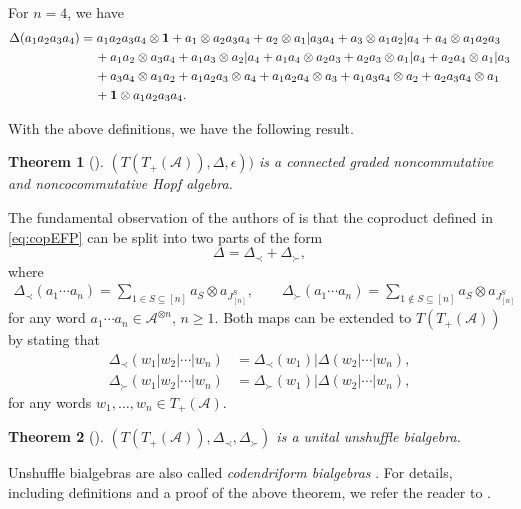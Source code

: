 \documentclass[pdftex]{sigma}%
\numberwithin{equation}{section}
\newtheorem{Theorem}{Theorem}[section]
\newcommand{\A}{\mathcal{A}}
\newcommand{\uno}{{\bf{1}}}
\begin{document}
\begin{Example}
For $n=4$, we have
\begin{align*}
	\Delta(a_1a_2a_3a_4)
={} & a_1a_2a_3a_4\otimes \uno + a_1 \otimes a_2a_3a_4 + a_2\otimes a_1| a_3a_4 + a_3 \otimes a_1a_2| a_4 + a_4\otimes a_1a_2a_3
	\\&\!{} + a_1a_2\otimes a_3a_4 + a_1a_3\otimes a_2|a_4 + a_1a_4\otimes a_2a_3 + a_2a_3\otimes a_1|a_4 + a_2a_4\otimes a_1|a_3
	\\&\!{} + a_3a_4\otimes a_1a_2 + a_1a_2a_3\otimes a_4 + a_1a_2a_4\otimes a_3 + a_1a_3a_4\otimes a_2 + a_2a_3a_4\otimes a_1
	\\&\!{} + \uno \otimes a_1a_2a_3a_4.
\end{align*}
\end{Example}
With the above definitions, we have the following result.

\begin{Theorem}[\cite{EFP1}]\label{thm:HopfAlg}
$(T(T_+(\A)),\Delta,\epsilon))$ is a connected graded noncommutative and noncocommutative Hopf algebra.
\end{Theorem}

The fundamental observation of the authors of \cite{EFP1} is that the coproduct defined in \eqref{eq:copEFP} can be split into two parts of the form
\[
	\Delta = \Delta_\prec + \Delta_\succ,
\]
where
\begin{gather*}
	\Delta_\prec (a_1\cdots a_n)
	= \sum_{1\in S\subseteq [n]} a_S \otimes a_{J_{[n]}^S},\qquad
 	\Delta_\succ (a_1\cdots a_n)
	= \sum_{1\not\in S\subseteq [n]} a_S \otimes a_{J_{[n]}^S}
\end{gather*}
for any word $a_1\cdots a_n\in \A^{\otimes n}$, $n\geq 1$. Both maps can be extended to $T(T_+(\A))$ by stating that
\begin{align*}
	\Delta_\prec(w_1|w_2|\cdots |w_n)
	&= \Delta_\prec(w_1)|\Delta(w_2|\cdots|w_n),\\
	\Delta_\succ(w_1|w_2|\cdots |w_n)
	&= \Delta_\succ(w_1)|\Delta(w_2|\cdots|w_n),
\end{align*}
for any words $w_1,\dots,w_n\in T_+(\A)$.

\begin{Theorem}[\cite{EFP1}]
\label{thm:unshuffle}
$(T(T_+(\A)),\Delta_\prec,\Delta_\succ)$ is a unital unshuffle bialgebra.
\end{Theorem}

Unshuffle bialgebras are also called \textit{codendriform bialgebras} \cite{Foissy}. For details, including definitions and a proof of the above theorem, we refer the reader to \cite[Theorem~5]{EFP1}.
\end{document}
